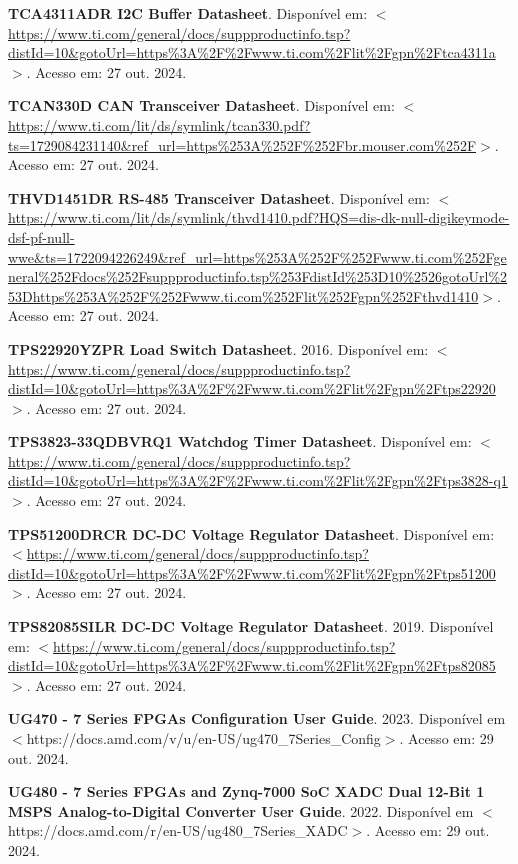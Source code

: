 \begin{flushleft}
\begin{thebibliography}{00}
 \textbf{TCA4311ADR I2C Buffer Datasheet}. Disponível em: $<$\url{https://www.ti.com/general/docs/suppproductinfo.tsp?distId=10\&gotoUrl=https\%3A\%2F\%2Fwww.ti.com\%2Flit\%2Fgpn\%2Ftca4311a}$>$. Acesso em: 27 out. 2024. 

 \textbf{TCAN330D CAN Transceiver Datasheet}. Disponível em: $<$\url{https://www.ti.com/lit/ds/symlink/tcan330.pdf?ts=1729084231140\&ref\_url=https\%253A\%252F\%252Fbr.mouser.com\%252F}$>$. Acesso em: 27 out. 2024. 

 \textbf{THVD1451DR RS-485 Transceiver Datasheet}. Disponível em: $<$\url{https://www.ti.com/lit/ds/symlink/thvd1410.pdf?HQS=dis-dk-null-digikeymode-dsf-pf-null-wwe\&ts=1722094226249\&ref\_url=https\%253A\%252F\%252Fwww.ti.com\%252Fgeneral\%252Fdocs\%252Fsuppproductinfo.tsp\%253FdistId\%253D10\%2526gotoUrl\%253Dhttps\%253A\%252F\%252Fwww.ti.com\%252Flit\%252Fgpn\%252Fthvd1410}$>$. Acesso em: 27 out. 2024. 

 \textbf{TPS22920YZPR Load Switch Datasheet}. 2016. Disponível em: $<$\url{https://www.ti.com/general/docs/suppproductinfo.tsp?distId=10\&gotoUrl=https\%3A\%2F\%2Fwww.ti.com\%2Flit\%2Fgpn\%2Ftps22920}$>$. Acesso em: 27 out. 2024. 

 \textbf{TPS3823-33QDBVRQ1 Watchdog Timer Datasheet}. Disponível em: $<$\url{https://www.ti.com/general/docs/suppproductinfo.tsp?distId=10\&gotoUrl=https\%3A\%2F\%2Fwww.ti.com\%2Flit\%2Fgpn\%2Ftps3828-q1}$>$. Acesso em: 27 out. 2024. 

 \textbf{TPS51200DRCR DC-DC Voltage Regulator Datasheet}. Disponível em: $<$\url{https://www.ti.com/general/docs/suppproductinfo.tsp?distId=10\&gotoUrl=https\%3A\%2F\%2Fwww.ti.com\%2Flit\%2Fgpn\%2Ftps51200}$>$. Acesso em: 27 out. 2024. 

 \textbf{TPS82085SILR DC-DC Voltage Regulator Datasheet}. 2019. Disponível em: $<$\url{https://www.ti.com/general/docs/suppproductinfo.tsp?distId=10\&gotoUrl=https\%3A\%2F\%2Fwww.ti.com\%2Flit\%2Fgpn\%2Ftps82085}$>$. Acesso em: 27 out. 2024. 

 \textbf{UG470 - 7 Series FPGAs Configuration User Guide}. 2023. Disponível em $<$https://docs.amd.com/v/u/en-US/ug470\_7Series\_Config$>$. Acesso em: 29 out. 2024.

 \textbf{UG480 - 7 Series FPGAs and Zynq-7000 SoC XADC Dual 12-Bit 1 MSPS Analog-to-Digital Converter User Guide}. 2022. Disponível em $<$https://docs.amd.com/r/en-US/ug480\_7Series\_XADC$>$. Acesso em: 29 out. 2024.


\end{thebibliography}
\end{flushleft}
